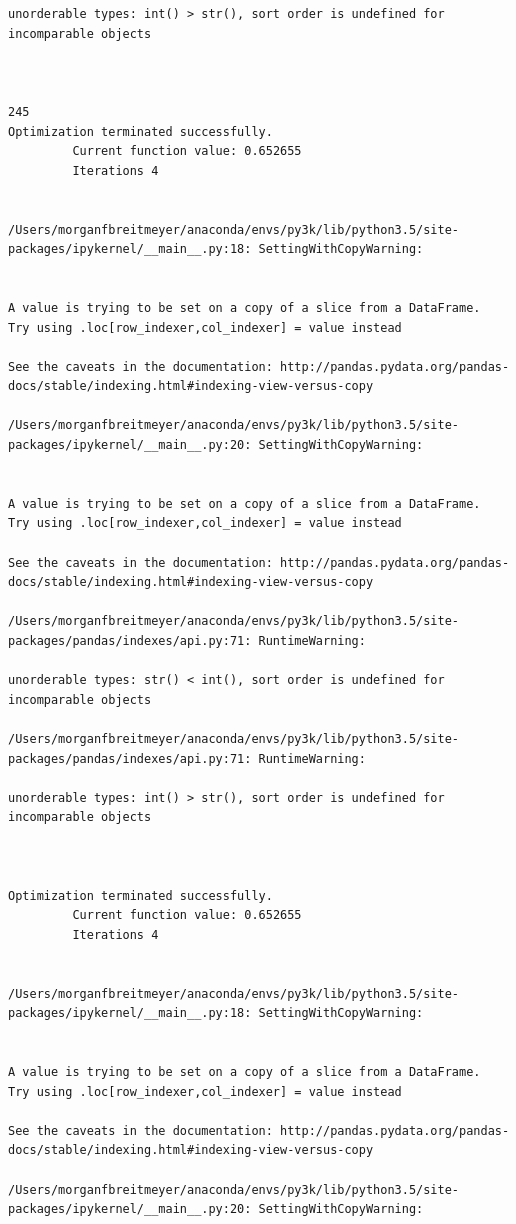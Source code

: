 \begin{lstlisting}
unorderable types: int() > str(), sort order is undefined for incomparable objects



245
Optimization terminated successfully.
         Current function value: 0.652655
         Iterations 4


/Users/morganfbreitmeyer/anaconda/envs/py3k/lib/python3.5/site-packages/ipykernel/__main__.py:18: SettingWithCopyWarning:


A value is trying to be set on a copy of a slice from a DataFrame.
Try using .loc[row_indexer,col_indexer] = value instead

See the caveats in the documentation: http://pandas.pydata.org/pandas-docs/stable/indexing.html#indexing-view-versus-copy

/Users/morganfbreitmeyer/anaconda/envs/py3k/lib/python3.5/site-packages/ipykernel/__main__.py:20: SettingWithCopyWarning:


A value is trying to be set on a copy of a slice from a DataFrame.
Try using .loc[row_indexer,col_indexer] = value instead

See the caveats in the documentation: http://pandas.pydata.org/pandas-docs/stable/indexing.html#indexing-view-versus-copy

/Users/morganfbreitmeyer/anaconda/envs/py3k/lib/python3.5/site-packages/pandas/indexes/api.py:71: RuntimeWarning:

unorderable types: str() < int(), sort order is undefined for incomparable objects

/Users/morganfbreitmeyer/anaconda/envs/py3k/lib/python3.5/site-packages/pandas/indexes/api.py:71: RuntimeWarning:

unorderable types: int() > str(), sort order is undefined for incomparable objects



Optimization terminated successfully.
         Current function value: 0.652655
         Iterations 4


/Users/morganfbreitmeyer/anaconda/envs/py3k/lib/python3.5/site-packages/ipykernel/__main__.py:18: SettingWithCopyWarning:


A value is trying to be set on a copy of a slice from a DataFrame.
Try using .loc[row_indexer,col_indexer] = value instead

See the caveats in the documentation: http://pandas.pydata.org/pandas-docs/stable/indexing.html#indexing-view-versus-copy

/Users/morganfbreitmeyer/anaconda/envs/py3k/lib/python3.5/site-packages/ipykernel/__main__.py:20: SettingWithCopyWarning:



\end{lstlisting}
